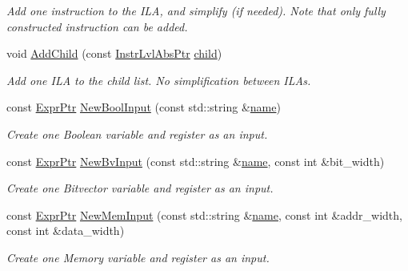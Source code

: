 \begin{DoxyCompactItemize}
\begin{DoxyCompactList}\small\item\em Add one instruction to the I\+LA, and simplify (if needed). Note that only fully constructed instruction can be added. \end{DoxyCompactList}\item 
void \mbox{\hyperlink{classilang_1_1_instr_lvl_abs_a89241c146f831d68ed0145b6caaabe92}{Add\+Child}} (const \mbox{\hyperlink{classilang_1_1_instr_lvl_abs_a743fd98e5ad145d70cb0dabf8db0007c}{Instr\+Lvl\+Abs\+Ptr}} \mbox{\hyperlink{classilang_1_1_instr_lvl_abs_a7ded25cab323c59aff7910bd03a268b5}{child}})
\begin{DoxyCompactList}\small\item\em Add one I\+LA to the child list. No simplification between I\+L\+As. \end{DoxyCompactList}\item 
const \mbox{\hyperlink{namespaceilang_a7c4196c72e53ea4df4b7861af7bc3bce}{Expr\+Ptr}} \mbox{\hyperlink{classilang_1_1_instr_lvl_abs_ab470870aff4b75bcbe35a239890a5079}{New\+Bool\+Input}} (const std\+::string \&\mbox{\hyperlink{classilang_1_1_object_acf20b072e69f572910d7d80c93af0b38}{name}})
\begin{DoxyCompactList}\small\item\em Create one Boolean variable and register as an input. \end{DoxyCompactList}\item 
const \mbox{\hyperlink{namespaceilang_a7c4196c72e53ea4df4b7861af7bc3bce}{Expr\+Ptr}} \mbox{\hyperlink{classilang_1_1_instr_lvl_abs_a7d0fc6b753de534f4175418167f833f3}{New\+Bv\+Input}} (const std\+::string \&\mbox{\hyperlink{classilang_1_1_object_acf20b072e69f572910d7d80c93af0b38}{name}}, const int \&bit\+\_\+width)
\begin{DoxyCompactList}\small\item\em Create one Bitvector variable and register as an input. \end{DoxyCompactList}\item 
const \mbox{\hyperlink{namespaceilang_a7c4196c72e53ea4df4b7861af7bc3bce}{Expr\+Ptr}} \mbox{\hyperlink{classilang_1_1_instr_lvl_abs_ae2ef1765a33fdc26c1a8e269408e11b3}{New\+Mem\+Input}} (const std\+::string \&\mbox{\hyperlink{classilang_1_1_object_acf20b072e69f572910d7d80c93af0b38}{name}}, const int \&addr\+\_\+width, const int \&data\+\_\+width)
\begin{DoxyCompactList}\small\item\em Create one Memory variable and register as an input. \end{DoxyCompactList}\item 

\end{DoxyCompactItemize}
